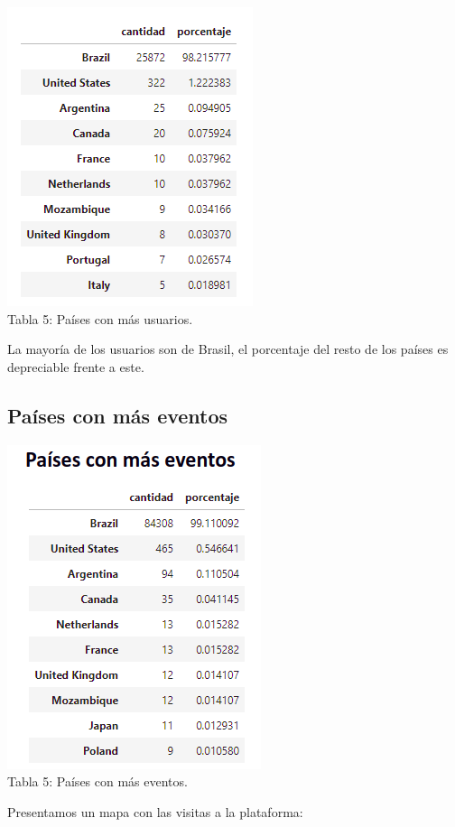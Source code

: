 \documentclass[a4paper ,12pt]{article}
\begin{document}
\begin{center}
	\includegraphics[width=0.5\linewidth]{table_8}
	\\Tabla 5: Países con más usuarios.
	
\end{center}

La mayoría de los usuarios son de Brasil, el porcentaje del resto de los países es depreciable frente a este.

\subsection{Países con más eventos}

\begin{center}
	\includegraphics[width=0.5\linewidth]{table_9}
	\\Tabla 5: Países con más eventos.
	
\end{center}

\newpage
Presentamos un mapa con las visitas a la plataforma:
\end{document}
